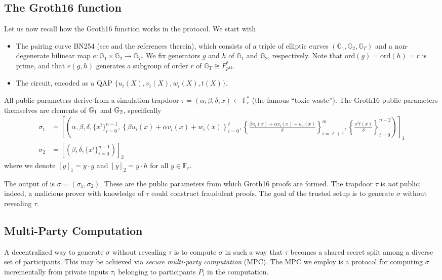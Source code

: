 \subsection{The Groth16 \Setup{} function}
Let us now recall how the Groth16 \Setup{} function works in the \MantaPay{} protocol. We start with 
\begin{itemize}
\item The pairing curve BN254 (see \cite{Naehrig10} and the references therein), which consists of a triple of elliptic curves $(\mathbb{G}_1, \mathbb{G}_2,\mathbb{G}_T) $ and a non-degenerate bilinear map $e: \mathbb{G}_1 \times \mathbb{G}_2 \to \mathbb{G}_T$. We fix generators $g$ and $h$ of $\mathbb{G}_1$ and $\mathbb{G}_2$, respectively. Note that $\textrm{ord}(g) = \textrm{ord}(h) = r$ is prime, and that $e(g,h)$ generates a subgroup of order $r$ of $\mathbb{G}_T \cong F_{p^{12}}^*$.
\item The \MantaPay{} circuit, encoded as a QAP $\{u_i(X), v_i(X), w_i(X), t(X)\}$.
\end{itemize}
All public parameters derive from a simulation trapdoor $\tau = (\alpha, \beta, \delta, x) \leftarrow \mathbb{F}_r^*$ (the famous ``toxic waste''). The Groth16 public parameters themselves are elements of $\mathbb{G}_1$ and $\mathbb{G}_2$, specifically
\begin{equation}\label{eq: prover_key}
    \begin{split} %
\sigma_1 &= \left[ \left(\alpha, \beta, \delta, \{ x^i \}_{i=0}^{n-1},\left\{  \beta u_i(x) + \alpha v_i(x) + w_i(x) \right\}_{i=0}^\ell, \left\{  \frac{\beta u_i(x) + \alpha v_i(x) + w_i(x)}{\delta} \right\}_{i=\ell+1}^m, \left\{ \frac{x^i t(x)}{\delta} \right\}_{i=0}^{n-2} \right) \right]_1 \\
\sigma_2 &= \left[ \left( \beta, \delta,  \{ x^i \}_{i=0}^{n-1} \right) \right]_2
    \end{split}
\end{equation} 
where we denote $[y]_1 = y \cdot g$ and $[y]_2 = y \cdot h$ for all $y \in \mathbb{F}_r$. 

The output of \Setup{} is $\sigma = (\sigma_1, \sigma_2)$. These are the public parameters from which Groth16 proofs are formed. The trapdoor $\tau$ is \emph{not} public; indeed, a malicious prover with knowledge of $\tau$ could construct fraudulent proofs. The goal of the trusted setup is to generate $\sigma$ without revealing $\tau$.

\subsection{Multi-Party Computation}
A decentralized way to generate $\sigma$ without revealing $\tau$ is to compute $\sigma$ in such a way that $\tau$ becomes a shared secret split among a diverse set of participants. This may be achieved via \emph{secure multi-party computation} (MPC). The MPC we employ is a protocol for computing $\sigma$ incrementally from private inputs $\tau_i$ belonging to participants $P_i$ in the computation. 

